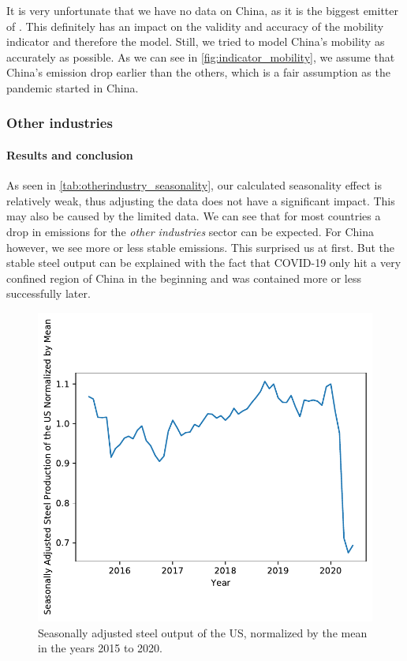 		It is very unfortunate that we have no data on China, as it is the biggest emitter of \co. This definitely has an impact on the validity and accuracy of the mobility indicator and therefore the model. Still, we tried to model China's mobility as accurately as possible. As we can see in \autoref{fig:indicator_mobility}, we assume that China's emission drop earlier than the others, which is a fair assumption as the pandemic started in China.
		
\subsubsection{Other industries}

\paragraph{Results and conclusion}
As seen in \autoref{tab:otherindustry_seasonality}, our calculated seasonality effect is relatively weak, thus adjusting the data does not have a significant impact. This may also be caused by the limited data.
We can see that for most countries a drop in \co emissions for the \textit{other industries} sector can be expected. For China however, we see more or less stable emissions. This surprised us at first. But the stable steel output can be explained with the fact that COVID-19 only hit a very confined region of China in the beginning and was contained more or less successfully later.

\begin{figure}[hbt]
	\centering
	\includegraphics[width=0.69\linewidth]{../predictions/steelUS_seasonadjusted.pdf}
	\caption{Seasonally adjusted steel output of the US, normalized by the mean in the years 2015 to 2020.}
	\label{fig:steelUS_adjusted}
	\end{figure}
	

